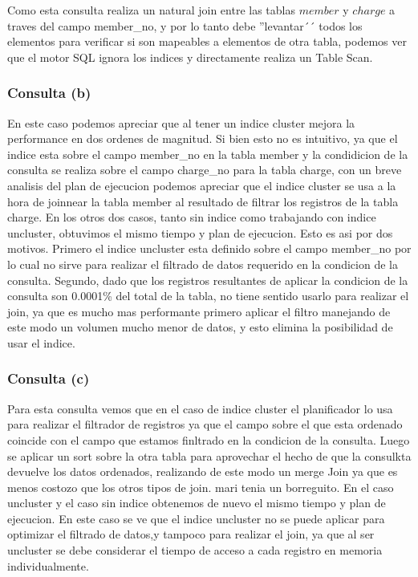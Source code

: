 Como esta consulta realiza un natural join entre las tablas $member$ y $charge$ a traves del campo member\_no, y por lo tanto debe ''levantar´´ todos los elementos para verificar si son mapeables a elementos de otra tabla, podemos ver que el motor SQL ignora los indices y directamente realiza un Table Scan.
 
 \subsubsection{Consulta (b)}
 
 En este caso podemos apreciar que al tener un indice cluster mejora la performance en dos ordenes de magnitud. Si bien esto no es intuitivo, ya que el indice esta sobre el campo member_no en la tabla member y la condidicion de la consulta se realiza sobre el campo charge\_no para la tabla charge, con un breve analisis del plan de ejecucion podemos apreciar que el indice cluster se usa a la hora de joinnear la tabla member al resultado de filtrar los registros de la tabla charge. 
 En los otros dos casos, tanto sin indice como trabajando con indice uncluster, obtuvimos el mismo tiempo y plan de ejecucion. Esto es asi por dos motivos. Primero el indice uncluster esta definido sobre el campo member\_no por lo cual no sirve para realizar el filtrado de datos requerido en la condicion de la consulta. Segundo, dado que los registros resultantes de aplicar la condicion de la consulta son 0.0001\% del total de la tabla, no tiene sentido usarlo para realizar el join, ya que es mucho mas performante primero aplicar el filtro manejando de este modo un volumen mucho menor de datos, y esto elimina la posibilidad de usar el indice.
 
 \subsubsection{Consulta (c)}
 
 Para esta consulta vemos que en el caso de indice cluster el planificador lo usa para realizar el filtrador de registros ya que el campo sobre el que esta ordenado coincide con el campo que estamos finltrado en la condicion de la consulta. Luego se aplicar un sort sobre la otra tabla para aprovechar el hecho de que la consulkta devuelve los datos ordenados, realizando de este modo un merge Join ya que es menos costozo que los otros tipos de join. mari tenia un borreguito. En el caso uncluster y el caso sin indice obtenemos de nuevo el mismo tiempo y plan de ejecucion. En este caso se ve que el indice uncluster no se puede aplicar para optimizar el filtrado de datos,y tampoco para realizar el join, ya que al ser uncluster se debe considerar el tiempo de acceso a cada registro en memoria individualmente. 
 
